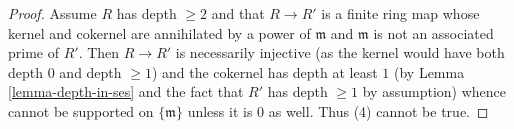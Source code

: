 \documentclass{amsart}
\theoremstyle{plain}
\theoremstyle{definition}
\theoremstyle{remark}
\numberwithin{equation}{subsection}
\begin{document}
\begin{proof}
\medskip\noindent
Assume $R$ has depth $\geq 2$ and that $R \to R'$ is a finite
ring map whose kernel and cokernel are annihilated by a power
of $\mathfrak m$ and $\mathfrak m$ is not an associated prime of $R'$.
Then $R \to R'$ is necessarily injective (as the kernel would have
both depth $0$ and depth $\geq 1$) and the cokernel has depth
at least $1$ (by Lemma \ref{lemma-depth-in-ses}
and the fact that $R'$ has depth $\geq 1$ by assumption)
whence cannot be supported on
$\{\mathfrak m\}$ unless it is $0$ as well. Thus (4) cannot be true.
\end{proof}
\end{document}
